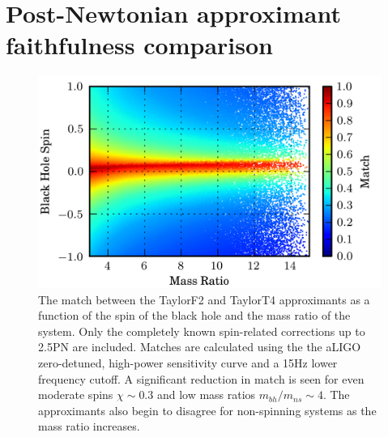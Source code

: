 \section{Post-Newtonian approximant faithfulness comparison}
\label{sec:faithfulness}

\begin{figure}
\begin{center}
\includegraphics{papers/nsbh_faithfulness/figure2.png}
\end{center}
\caption{\label{fig:f2f4f}The match between the TaylorF2 and
TaylorT4 approximants as a function of the spin of the black hole
and the mass ratio of the system. Only the completely known 
spin-related corrections up to 2.5\ac{PN} are included. Matches are calculated using the
the aLIGO zero-detuned, high-power sensitivity curve and a 15Hz lower frequency cutoff.
A significant reduction in match is seen for even moderate spins $\chi \sim 0.3$
and low mass ratios $m_{bh}/m_{ns} \sim 4$. The approximants also begin to disagree for non-spinning
systems as the mass ratio increases.
}


\end{figure}


